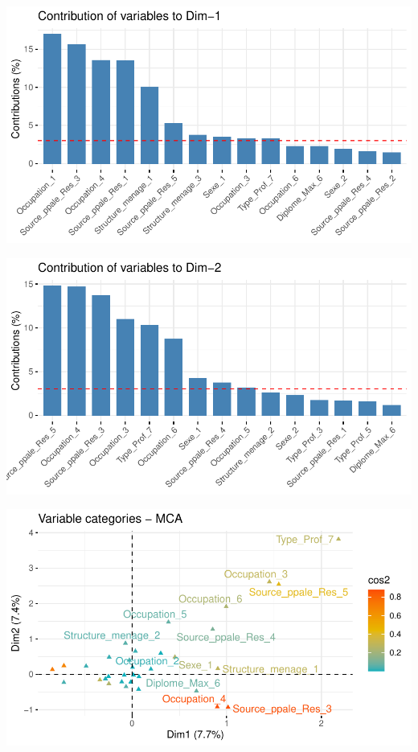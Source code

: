 \documentclass[11pt,a4paper, x11names]{article}\usepackage[]{graphicx}\usepackage[]{color}
\makeatletter
\def\maxwidth{ %
  \ifdim\Gin@nat@width>\linewidth
    \linewidth
  \else
    \Gin@nat@width
  \fi
}
\newenvironment{knitrout}{}{} %
\makeatother
\begin{document}
\vfill
\begin{minipage}{0.49\linewidth}
\begin{mdframed}
\begin{knitrout}
\color{fgcolor}
\includegraphics[width=\maxwidth]{figure/unnamed-chunk-6-1} 

\includegraphics[width=\maxwidth]{figure/unnamed-chunk-6-2} 
\end{knitrout}
\end{mdframed}
\end{minipage}
\hfill
\begin{minipage}{0.49\linewidth}
\begin{mdframed}
\begin{knitrout}
\color{fgcolor}
\includegraphics[width=\maxwidth]{figure/unnamed-chunk-7-1} 
\end{knitrout}
\end{mdframed}
\end{minipage}
\end{document}
